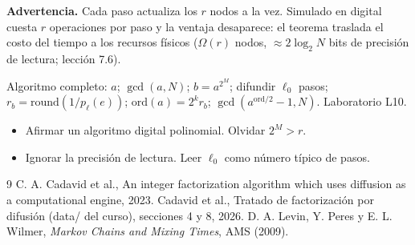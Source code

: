 \documentclass[11pt,a4paper]{article}
\begin{document}
\textbf{Advertencia.} Cada paso actualiza los $r$ nodos a la vez. Simulado en digital cuesta $r$ operaciones por paso y la ventaja desaparece: el teorema traslada
el costo del tiempo a los recursos físicos ($\Omega(r)$ nodos, $\approx2\log_2N$ bits de precisión de lectura; lección 7.6).

\begin{aplicacion}
Algoritmo completo: $a$; $\gcd(a,N)$; $b=a^{2^M}$; difundir $\ell_0$ pasos; $r_b=\mathrm{round}(1/p_\ell(e))$; $\mathrm{ord}(a)=2^kr_b$; $\gcd(a^{\mathrm{ord}/2}-1,N)$. Laboratorio L10.
\end{aplicacion}

\begin{error}
\begin{itemize}[nosep]
\item Afirmar un algoritmo digital polinomial. \quad Olvidar $2^M>r$.
\item Ignorar la precisión de lectura. \quad Leer $\ell_0$ como número típico de pasos.
\end{itemize}
\end{error}

\begin{thebibliography}{9}\small
{} C. A. Cadavid et al., An integer factorization algorithm which uses diffusion as a computational engine, 2023.
 Cadavid et al., Tratado de factorización por difusión (data/ del curso), secciones 4 y 8, 2026.
 D. A. Levin, Y. Peres y E. L. Wilmer, \emph{Markov Chains and Mixing Times}, AMS (2009).
\end{thebibliography}
\end{document}
